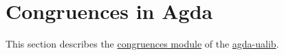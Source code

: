 \documentclass[sigplan,screen]{acmart}
\newcommand\congruencesmodule{\href{https://gitlab.com/ualib/ualib.gitlab.io/-/blob/master/congruences.lagda.rst}{congruences module}\xspace}
\newcommand{\agdaualib}{\href{https://ualib.org}{agda-ualib}\xspace}
\newcommand{\agdaualib}{\href{anonymizedLink/agda-ualib.html}{agda-ualib}\xspace}
\newcommand\congruencesmodule{\href{anonymizedLink/congruences.lagda.rst}{congruences module}\xspace}
\begin{document}
\begin{code}%
%
\>[1]\AgdaSpace{}%
\AgdaSymbol{:}\AgdaSpace{}%
\AgdaSpace{}%
\AgdaSpace{}%
\AgdaSpace{}%
\AgdaSpace{}%
\AgdaSpace{}%
\AgdaSpace{}%
\AgdaSpace{}%
\AgdaSpace{}%
\AgdaSpace{}%
\AgdaSpace{}%
\<%
\\
%
\>[1]\AgdaSpace{}%
\AgdaSpace{}%
\AgdaSpace{}%
\AgdaSymbol{=}\AgdaSpace{}%
\AgdaSpace{}%
\AgdaSpace{}%
\AgdaSpace{}%
\AgdaSymbol{(}\AgdaSpace{}%
\AgdaSpace{}%
\AgdaSpace{}%
\AgdaSpace{}%
\AgdaSymbol{)}\AgdaSpace{}%
\AgdaFunction{,}\AgdaSpace{}%
\AgdaSpace{}%
\<%
\end{code}



\section{Congruences in Agda}\label{congruences-in-agda}
This section describes the \congruencesmodule of the \agdaualib.

\end{document}
